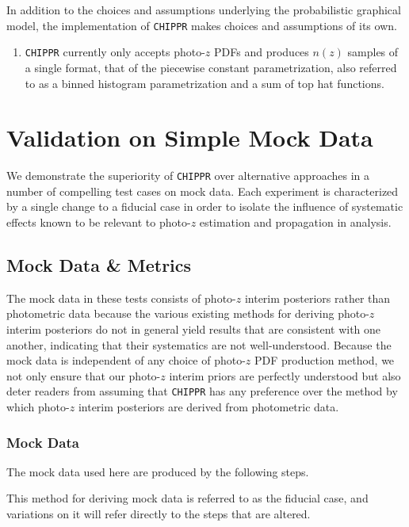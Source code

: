 \documentclass[iop]{emulateapj}
\newcommand{\chippr}{\texttt{CHIPPR} }
\begin{document}
In addition to the choices and assumptions underlying the probabilistic 
graphical model, the implementation of \chippr makes choices and assumptions of 
its own.

\begin{enumerate}
	\item \chippr currently only accepts photo-$z$ PDFs and produces $n(z)$ 
samples of a single format, that of the piecewise constant parametrization, 
also referred to as a binned histogram parametrization and a sum of top hat 
functions.
\end{enumerate}

\section{Validation on Simple Mock Data}
\label{sec:validation}

We demonstrate the superiority of \chippr over alternative approaches in a 
number of compelling test cases on mock data.  Each experiment is characterized 
by a single change to a fiducial case in order to isolate the influence of 
systematic effects known to be relevant to photo-$z$ estimation and propagation 
in analysis.  

\subsection{Mock Data \& Metrics}
\label{sec:validintro}

The mock data in these tests consists of photo-$z$ interim posteriors rather 
than photometric data because the various existing methods for deriving 
photo-$z$ interim posteriors do not in general yield results that are 
consistent with one another, indicating that their systematics are not 
well-understood.  Because the mock data is independent of any choice of 
photo-$z$ PDF production method, we not only ensure that our photo-$z$ interim 
priors are perfectly understood but also deter readers from assuming that 
\chippr has any preference over the method by which photo-$z$ interim 
posteriors are derived from photometric data.

\subsubsection{Mock Data}
\label{sec:mockdata}

The mock data used here are produced by the following steps.  

This method for deriving mock data is referred to as the fiducial case, and 
variations on it will refer directly to the steps that are altered.
\end{document}
